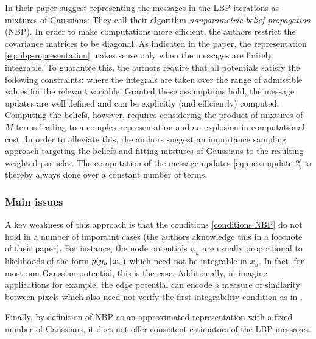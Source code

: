 In their paper \citet{sudderth03} suggest representing the messages in the LBP iterations as mixtures of Gaussians:
They call their algorithm \emph{nonparametric belief propagation} (NBP). In order to make computations more efficient, the authors restrict the covariance matrices to be diagonal.
As indicated in the paper, the representation \eqref{eq:nbp-representation} makes sense only when the messages are finitely integrable. To guarantee this, the authors require that all potentials satisfy the following constraints:
where the integrals are taken over the range of admissible values for the relevant variable. Granted these assumptions hold, the message updates are well defined and can be explicitly (and efficiently) computed. Computing the beliefs, however, requires considering the product of mixtures of $M$ terms leading to a complex representation and an explosion in computational cost. In order to alleviate this, the authors suggest an importance sampling approach targeting the beliefs and fitting mixtures of Gaussians to the resulting weighted particles. 
The computation of the message updates \eqref{eq:mess-update-2} is thereby always done over a constant number of terms.

\subsubsection*{Main issues}

A key weakness of this approach is that the conditions \eqref{conditions NBP} do not hold in a number of important cases (the authors aknowledge this in a footnote of their paper). 
For instance, the node potentials $\psi_{u}$ are usually proportional to likelihoods of the form $p(y_{u}\,|\, x_{u})$ which need not be integrable in $x_{u}$. In fact, for most non-Gaussian potential, this is the case. Additionally, in imaging applications for example, the edge potential can encode a measure of similarity between pixels which also need not verify the first integrability condition as in \citet{nikolova00}.

Finally, by definition of NBP as an approximated representation with a fixed number of Gaussians, it does not offer consistent estimators of the LBP messages.



